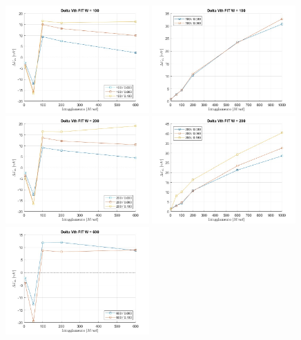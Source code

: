 \documentclass[12pt, letterpaper]{book}
\begin{document}
\begin{figure}[H]
  \centering
  \includegraphics[width=0.49\textwidth]{sovrapposizione-deltaVth-FIT-N100}
  \includegraphics[width=0.49\textwidth]{sovrapposizione-deltaVth-FIT-P100}
  \includegraphics[width=0.49\textwidth]{sovrapposizione-deltaVth-FIT-N200}
  \includegraphics[width=0.49\textwidth]{sovrapposizione-deltaVth-FIT-P200}
  \includegraphics[width=0.49\textwidth]{sovrapposizione-deltaVth-FIT-N600}

\end{figure}
\end{document}
